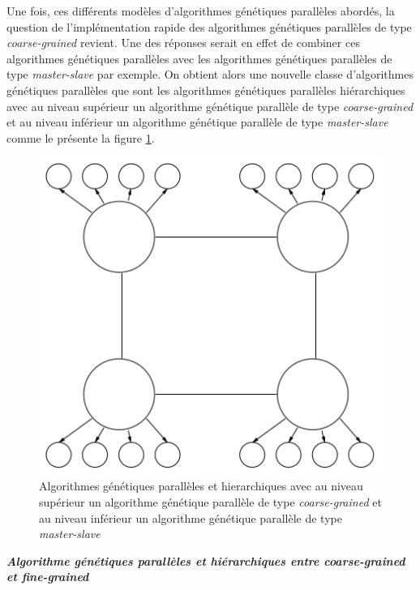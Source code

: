 	\hspace*{.5cm} Une fois, ces différents modèles d'algorithmes génétiques parallèles abordés, la question de l'implémentation rapide des algorithmes génétiques parallèles de type \emph{coarse-grained }revient. Une des réponses serait en effet de combiner ces algorithmes génétiques parallèles avec les algorithmes génétiques parallèles de type \emph{master-slave} par exemple. On obtient alors une nouvelle classe d'algorithmes génétiques parallèles que sont les algorithmes génétiques parallèles hiérarchiques\cite{cant2} avec au niveau supérieur un algorithme génétique parallèle de type \emph{coarse-grained} et au niveau inférieur un algorithme génétique parallèle de type \emph{master-slave} comme le présente la figure \ref{fig:hierarchical_gene1_fig}. \\
 	
	\begin{figure}[!h]
		\begin{center}
			\includegraphics[scale=.3]{images/hierarchical_gene1_fig.png}
			\caption{Algorithmes génétiques parallèles et hierarchiques avec au niveau supérieur un algorithme génétique parallèle de type \emph{coarse-grained} et au niveau inférieur un algorithme génétique parallèle de type \emph{master-slave} \cite{cant2}}
			\label{fig:hierarchical_gene1_fig}
		\end{center}
	\end{figure} 	
	
	\textsl{\textbf{Algorithme génétiques parallèles et hiérarchiques entre \emph{coarse-grained} et \emph{fine-grained}}}\\
	
